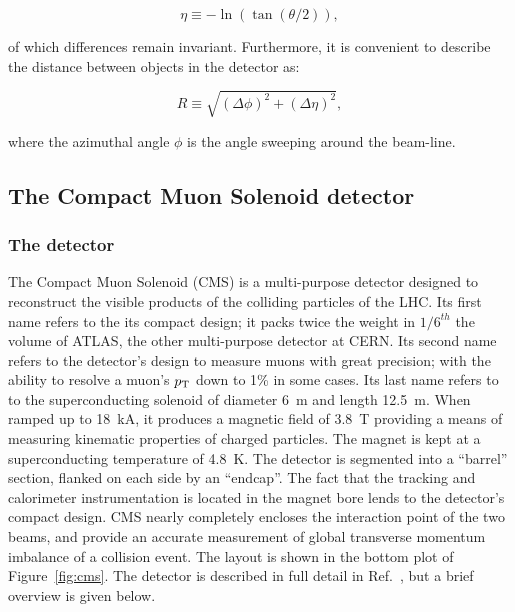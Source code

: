 \begin{equation}
        \eta \equiv −\ln\left( \tan\left(\theta/2\right)\right),
        \label{pseudo}      
\end{equation}

of which differences remain invariant. Furthermore, it is convenient to describe the distance between
objects in the detector as:

\begin{equation}
        R \equiv \sqrt{\left(\Delta\phi\right)^2 + \left(\Delta\eta\right)^2},
        \label{pseudo}      
\end{equation}

where the azimuthal angle $\phi$ is the angle sweeping around the beam-line.

\subsection{The Compact Muon Solenoid detector\label{sec:cms}}

\subsubsection{The detector}
The Compact Muon Solenoid (CMS) is a multi-purpose detector designed to reconstruct
the visible products of the colliding particles of the LHC. Its first name refers to 
the its compact design; it packs twice the weight in $1/6^{th}$ the volume of ATLAS, 
the other multi-purpose detector at CERN. Its second name refers to the detector's design
to measure muons with great precision; with the ability to resolve a muon's $p_{\mathrm{T}}$ down to 
1\% in some cases. Its last name refers to to the superconducting solenoid of diameter 
6~m and length 12.5~m. When ramped up to 18~kA, it produces a magnetic field of 3.8~T providing
a means of measuring kinematic properties of charged particles. The magnet is kept at a 
superconducting temperature of 4.8~K. The detector is segmented into a ``barrel'' 
section, flanked on each side by an ``endcap''. The fact that the tracking and calorimeter 
instrumentation is located in the magnet bore lends to the detector's compact design. 
CMS nearly completely encloses the interaction point of the two beams, and provide an 
accurate measurement of global transverse momentum imbalance of a collision event. The 
layout is shown in the bottom plot of Figure~\ref{fig:cms}. The detector is described in 
full detail in Ref.~\cite{1748-0221-3-08-S08004,Bayatian:922757,Bayatian:942733}, but a brief
overview is given below. 

